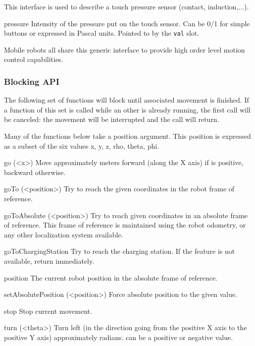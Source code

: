 This interface is used to describe a touch pressure sensor (contact,
induction,...).

\begin{urbiscriptapi}
\item[pressure] Intensity of the pressure put on the touch sensor. Can be
  0/1 for simple buttons or expressed in Pascal units. Pointed to by the
  \lstinline{val} slot.
\end{urbiscriptapi}



Mobile robots all share this generic interface to provide high order
level motion control capabilities.

\subsubsection{Blocking API}

The following set of functions will block until associated movement is
finished.  If a function of this set is called while an other is already
running, the first call will be canceled: the movement will be interrupted
and the call will return.

Many of the functions below take a position argument. This position is
expressed as a subset of the six values x, y, z, rho, theta, phi.

\begin{urbiscriptapi}
\item[go](<x>) Move approximately  meters forward (along the X axis)
  if  is positive, backward otherwise.


\item[goTo](<position>) Try to reach the given coordinates in the robot
  frame of reference.


\item[goToAbsolute](<position>) Try to reach given coordinates in an
  absolute frame of reference. This frame of reference is maintained using
  the robot odometry, or any other localization system available.


\item[goToChargingStation] Try to reach the charging station. If the feature
  is not available, return immediately.


\item[position] The current robot position in the absolute frame of
  reference.


\item[setAbsolutePosition](<position>) Force absolute position to the given
  value.


\item[stop] Stop current movement.


\item[turn](<theta>) Turn left (in the direction going from the positive X
  axis to the positive Y axis) approximately  radians.
   can be a positive or negative value.
\end{urbiscriptapi}


